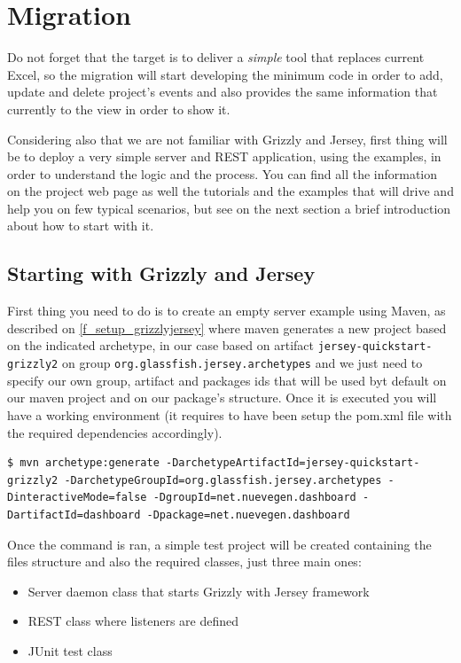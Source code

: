 \chapter{Migration}
Do not forget that the target is to deliver a \emph{simple} tool that replaces
current Excel, so the migration will start developing the minimum code in order
to add, update and delete project's events and also provides the same
information that currently to the view in order to show it.

Considering also that we are not familiar with Grizzly and Jersey, first thing
will be to deploy a very simple server and REST application, using the examples,
in order to understand the logic and the process. You can find all the
information on the project web page as well the tutorials and the examples that
will drive and help you on few typical scenarios, but see on the next section a
brief introduction about how to start with it.

\section{Starting with Grizzly and Jersey}
First thing you need to do is to create an empty server example using Maven,
as described on \ref{f_setup_grizzlyjersey} where maven generates a new
project based on the indicated archetype, in our case based on artifact
\texttt{jersey-quickstart-grizzly2} on group
\texttt{org.glassfish.jersey.archetypes} and we just need to specify our own
group, artifact and packages ids that will be used byt default on our maven
project and on our package's structure. Once it is executed you will have a
working environment (it requires to have been setup the pom.xml file with the required dependencies accordingly).\\

\begin{lstlisting}[style=console,caption=Grizzly\ and\ Jersey\ First\ setup,label=f_setup_grizzlyjersey] 
$ mvn archetype:generate -DarchetypeArtifactId=jersey-quickstart-grizzly2 -DarchetypeGroupId=org.glassfish.jersey.archetypes -DinteractiveMode=false -DgroupId=net.nuevegen.dashboard -DartifactId=dashboard -Dpackage=net.nuevegen.dashboard 
\end{lstlisting}

Once the command is ran, a simple test project will be created containing the
files structure and also the required classes, just three main ones: 
\begin{itemize}
  \item Server daemon class that starts Grizzly with Jersey framework
  \item REST class where listeners are defined
  \item JUnit test class
\end{itemize}

